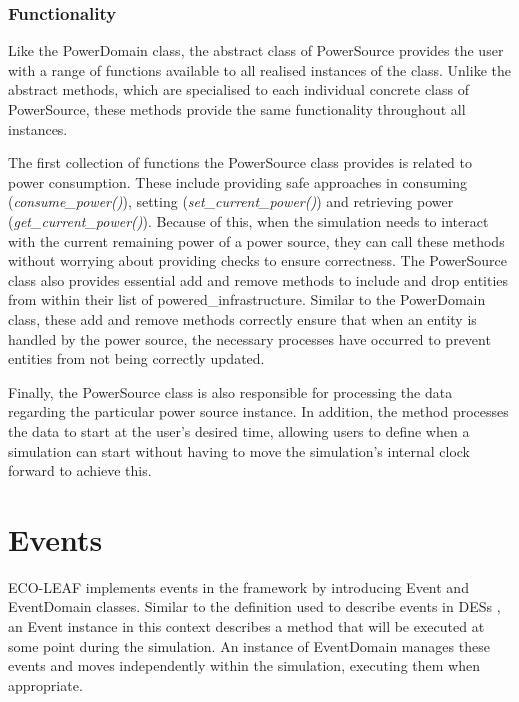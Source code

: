 \documentclass{l4proj}
\begin{document}
\subsubsection{Functionality}\label{imp:subsec:utility-funcs}
Like the PowerDomain class, the abstract class of PowerSource provides the user with a range of functions available to all realised instances of the class.
Unlike the abstract methods, which are specialised to each individual concrete class of PowerSource, these methods provide the same functionality throughout all instances.

The first collection of functions the PowerSource class provides is related to power consumption.
These include providing safe approaches in consuming (\textit{consume\_power()}), setting (\textit{set\_current\_power()}) and retrieving power (\textit{get\_current\_power()}).
Because of this, when the simulation needs to interact with the current remaining power of a power source, they can call these methods without worrying about providing checks to ensure correctness.
The PowerSource class also provides essential add and remove methods to include and drop entities from within their list of powered\_infrastructure.
Similar to the PowerDomain class, these add and remove methods correctly ensure that when an entity is handled by the power source, the necessary processes have occurred to prevent entities from not being correctly updated.

Finally, the PowerSource class is also responsible for processing the data regarding the particular power source instance.
In addition, the method processes the data to start at the user's desired time, allowing users to define when a simulation can start without having to move the simulation's internal clock forward to achieve this.

\section{Events}\label{imp:sec:envts}
ECO-LEAF implements events in the framework by introducing Event and EventDomain classes.
Similar to the definition used to describe events in DESs \citep{Des}, an Event instance in this context describes a method that will be executed at some point during the simulation.
An instance of EventDomain manages these events and moves independently within the simulation, executing them when appropriate.
\end{document}
